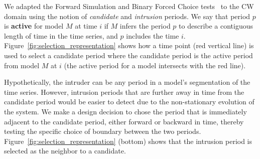 \documentclass[letterpaper]{article} %
\newcommand{\kibitz}[2]{\ifnum\Comments=1{\textcolor{#1}{#2}}\fi}
\newcommand{\bjg}[1]{\kibitz{purple}{[BG:#1]}}
\begin{document}



We adapted the Forward Simulation and Binary Forced Choice tests~\cite{doshi2017roadmap} to the CW domain using the notion of \textit{candidate} and \textit{intrusion} periods.  
We say that period $p$ is \textbf{active} for model $M$ at time $i$ if  $M$ infers the period $p$ to describe a contiguous length of time in the time series, and $p$ includes the time $i$.
Figure~\ref{fig:selection_representation} shows how a time point (red vertical line) is used to select a candidate period where the candidate period is the active period from model $M$ at $i$ (the active period for a model intersects with the red line).

Hypothetically, the intruder can be any period in a model's segmentation of the time series. 
However, intrusion periods that are further away in time from the candidate period would be easier to detect due to the non-stationary evolution of the system. 
We make a design decision to chose the period that is immediately adjacent to the candidate period, either forward or backward in time, thereby testing the specific choice of boundary between the two periods. 
Figure~\ref{fig:selection_representation} (bottom) shows that the intrusion period is selected as the neighbor to a candidate. 
\end{document}
